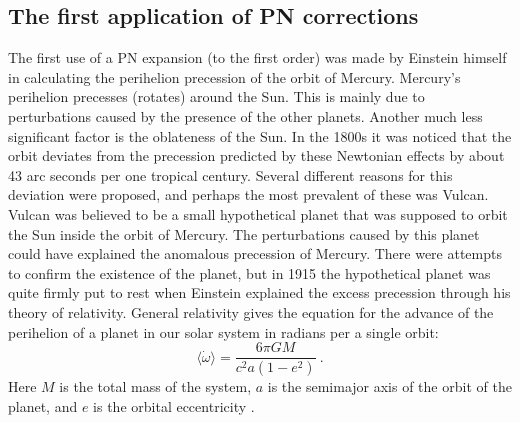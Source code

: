 \documentclass[english, oneside]{HYgradu}
\begin{document}
\subsection{The first application of PN corrections} \label{sect:PNapplication}

The first use of a PN expansion (to the first order) was made by Einstein himself in calculating the perihelion precession of the orbit of Mercury.
Mercury's perihelion precesses (rotates) around the Sun. This is mainly due to perturbations caused by the presence of the other planets. Another much less significant factor is the oblateness of the Sun. In the 1800s it was noticed that the orbit deviates from the precession predicted by these Newtonian effects by about 43 arc seconds per one tropical century.
Several different reasons for this deviation were proposed, and perhaps the most prevalent of these was Vulcan. Vulcan was believed to be a small hypothetical planet that was supposed to orbit the Sun inside the orbit of Mercury. The perturbations caused by this planet could have explained the anomalous precession of Mercury. 
There were attempts to confirm the existence of the planet, but in 1915 the hypothetical planet was quite firmly put to rest when Einstein explained the excess precession through his theory of relativity. General relativity gives the equation for the advance of the perihelion of a planet in our solar system in radians per a single orbit:
\begin{equation}
\langle \dot{\omega} \rangle = \frac{6 \pi G M}{c^2 a (1-e^2)} \ . \label{equ:pericenterShift}
\end{equation}
Here $M$ is the total mass of the system, $a$ is the semimajor axis of the orbit of the planet, and $e$ is the orbital eccentricity \citep{will:tegp}.
\end{document}
